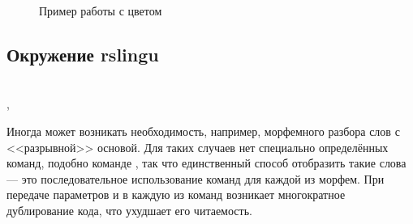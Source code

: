 \begin{figure}[H]
    \centering
    \begin{minipage}[c]{0.5\textwidth}
        \begin{Latexcode}
        \end{Latexcode}
    \end{minipage}
    \hfill
    \begin{minipage}[c]{0.4\textwidth}
        \small
    \end{minipage}

    \caption{Пример работы с цветом}
\end{figure}




\subsection{Окружение rslingu}

\ExplSyntaxOn
\begin{tcolorbox}
    \manModifier[env] \manColon{}
    \manCode{[\manKwargs{}]}
    \\
    \manTab{} \manKwargs{} \manColon{} , \manSpace{} 
\end{tcolorbox}
\ExplSyntaxOff

Иногда может возникать необходимость, например, морфемного разбора слов с <<разрывной>> основой. Для таких случаев нет специально
определённых команд, подобно команде , так что единственный способ отобразить такие слова --- это
последовательное использование команд для каждой из морфем. При передаче параметров  и  в каждую из
команд возникает многократное дублирование кода, что ухудшает его читаемость.

